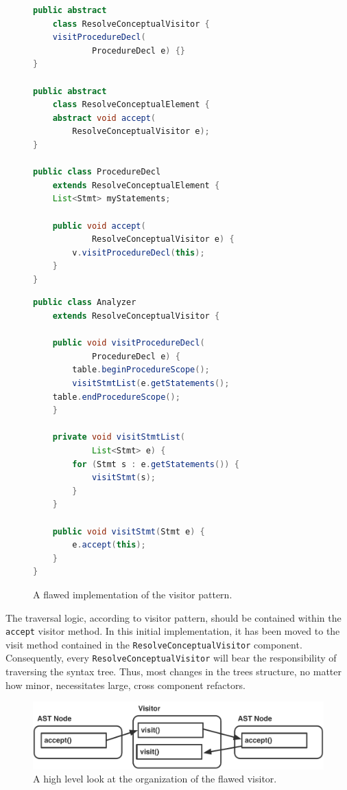 \documentclass[times]{speauth}
\begin{document}
\begin{figure}
\centering
\begin{minipage}{.45\textwidth}
\begin{lstlisting}[language=java]
public abstract
	class ResolveConceptualVisitor {
    visitProcedureDecl(
    		ProcedureDecl e) {}
}

public abstract 
	class ResolveConceptualElement {
    abstract void accept(
        ResolveConceptualVisitor e);
}

public class ProcedureDecl
	extends ResolveConceptualElement {	
    List<Stmt> myStatements;
    
    public void accept(
    		ResolveConceptualVisitor e) {
        v.visitProcedureDecl(this);
    }
}
\end{lstlisting}
\end{minipage}\quad
\begin{minipage}{.45\textwidth}
\begin{lstlisting}[language=java]
public class Analyzer
	extends ResolveConceptualVisitor {
	
    public void visitProcedureDecl(
  			ProcedureDecl e) {
        table.beginProcedureScope();
        visitStmtList(e.getStatements();
	table.endProcedureScope();
    }
    
    private void visitStmtList(
    		List<Stmt> e) {
        for (Stmt s : e.getStatements()) {
            visitStmt(s);
        }
    }
    
    public void visitStmt(Stmt e) {
        e.accept(this);
    }
}
\end{lstlisting}
\end{minipage}
\caption{A flawed implementation of the visitor pattern.}
\label{fig:flawedvisitorexample}
\end{figure}

The traversal logic, according to visitor pattern, should be contained within the \texttt{accept} visitor method. In this initial implementation, it has been moved to the visit method contained in the \texttt{ResolveConceptualVisitor} component. Consequently, every \texttt{ResolveConceptualVisitor} will bear the responsibility of traversing the syntax tree. Thus, most changes in the trees structure, no matter how minor, necessitates large, cross component refactors.

\begin{figure}[!htb]
\centering
\includegraphics[scale=.60]{figures/flawed_visitor_organization.pdf}
\caption{A high level look at the organization of the flawed visitor.}
\label{fig:flawedvisitororganization}
\end{figure}
\end{document}
